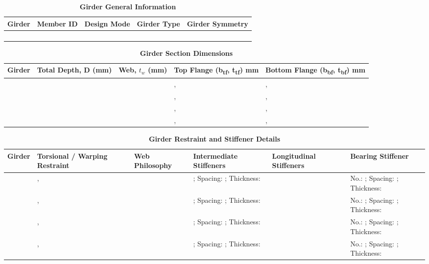 \documentclass[12pt,a4paper]{report}
\numberwithin{table}{chapter}
\numberwithin{figure}{chapter}
\begin{document}
\newpage

\vspace{0.4em}
\noindent
            
\vspace{4pt}
\begin{longtable}{|L{2.2cm}|L{1.8cm}|p{3.8cm}|p{3.8cm}|p{3.8cm}|}
\caption{\textbf{Girder General Information}}
\hline
\textbf{Girder} & \textbf{Member ID} & \textbf{Design Mode} & \textbf{Girder Type} & \textbf{Girder Symmetry} \\[6pt]
\hline
 &  &  &  &  \\[8pt]
\hline
 &  &  &  &  \\[8pt]
\hline
 &  &  &  &  \\[8pt]
\hline
 &  &  &  &  \\[8pt]
\hline
\end{longtable}

\vspace{0.6em}

\vspace{4pt}
\begin{longtable}{|L{1.8cm}|L{2.3cm}|L{1.8cm}|p{4.8cm}|p{4.8cm}|}
\caption{\textbf{Girder Section Dimensions}}
\hline
\textbf{Girder} & \textbf{Total Depth, D (mm)} & \textbf{Web, $t_w$ (mm)} & \textbf{Top Flange (b\textsubscript{tf}, t\textsubscript{tf}) mm} & \textbf{Bottom Flange (b\textsubscript{bf}, t\textsubscript{bf}) mm} \\[6pt]
\hline
 &  &  & ,  & ,  \\[8pt]
\hline
 &  &  & ,  & ,  \\[8pt]
\hline
 &  &  & ,  & ,  \\[8pt]
\hline
 &  &  & ,  & ,  \\[8pt]
\hline
\end{longtable}

\vspace{0.6em}

\vspace{4pt}
\begin{longtable}{|L{1.4cm}|p{2.2cm}|p{2.2cm}|p{3.0cm}|p{2.4cm}|p{2.2cm}|}
\caption{\textbf{Girder Restraint and Stiffener Details}}\\
\hline
\textbf{Girder} & \textbf{Torsional / Warping Restraint} & \textbf{Web Philosophy} & \textbf{Intermediate Stiffeners} & \textbf{Longitudinal Stiffeners} & \textbf{Bearing Stiffener} \\[6pt]
\hline
\endfirsthead
\endhead

 & ,  &  & ; Spacing: ; Thickness:  &  & No.: ; Spacing: ; Thickness:  \\[8pt]
\hline
 & ,  &  & ; Spacing: ; Thickness:  &  & No.: ; Spacing: ; Thickness:  \\[8pt]
\hline
 & ,  &  & ; Spacing: ; Thickness:  &  & No.: ; Spacing: ; Thickness:  \\[8pt]
\hline
 & ,  &  & ; Spacing: ; Thickness:  &  & No.: ; Spacing: ; Thickness:  \\[8pt]
\hline
\end{longtable}
\end{document}
